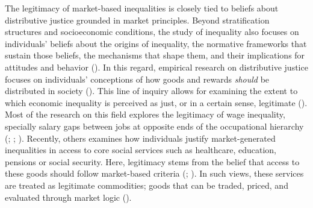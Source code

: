 \documentclass[
  13pt,
]{article}
\begin{document}
The legitimacy of market-based inequalities is closely tied to beliefs
about distributive justice grounded in market principles. Beyond
stratification structures and socioeconomic conditions, the study of
inequality also focuses on individuals' beliefs about the origins of
inequality, the normative frameworks that sustain those beliefs, the
mechanisms that shape them, and their implications for attitudes and
behavior ().
In this regard, empirical research on distributive justice focuses on
individuals' conceptions of how goods and rewards \emph{should} be
distributed in society (). This line of inquiry allows for examining the extent to
which economic inequality is perceived as just, or in a certain sense,
legitimate ().
Most of the research on this field explores the legitimacy of wage
inequality, specially salary gaps between jobs at opposite ends of the
occupational hierarchy
(;
;
). Recently,
others examines how individuals justify market-generated inequalities in
access to core social services such as healthcare, education, pensions
or social security. Here, legitimacy stems from the belief that access
to these goods should follow market-based criteria
(;
). In such views, these
services are treated as legitimate commodities; goods that can be
traded, priced, and evaluated through market logic
().
\end{document}
